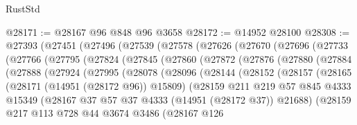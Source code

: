 \begin{lexlean}{RustStd}
\begin{coremodule}
@28171 := @28167 @96 @848 @96 @3658
@28172 := @14952 @28100
@28308 := @27393
    (@27451
      (@27496
        (@27539
          (@27578
            (@27626
              (@27670
                (@27696
                  (@27733
                    (@27766
                      (@27795
                        (@27824
                          (@27845
                            (@27860
                              (@27872
                                (@27876
                                  (@27880
                                    (@27884
                                      (@27888
                                        (@27924
                                          (@27995
                                            (@28078
                                              (@28096
                                                (@28144
                                                  (@28152
                                                    (@28157
                                                      (@28165
                                                        (@28171 (@14951 (@28172 @96)) @15809)
                                                        (@28159
                                                          @211
                                                          @219
                                                          @57
                                                          @845
                                                          @4333
                                                          @15349
                                                          (@28167
                                                            @37
                                                            @57
                                                            @37
                                                            @4333
                                                            (@14951 (@28172 @37))
                                                            @21688)
                                                          (@28159
                                                            @217
                                                            @113
                                                            @728
                                                            @44
                                                            @3674
                                                            @3486
                                                            (@28167
                                                              @126

\end{coremodule}
\end{lexlean}
